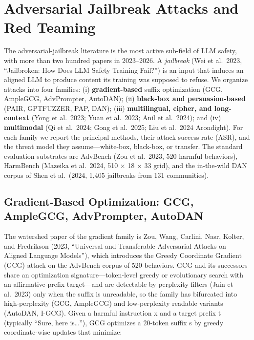 \documentclass{article}
\begin{document}
\section{Adversarial Jailbreak Attacks and Red Teaming}\label{adversarial-jailbreak-attacks-and-red-teaming}

The adversarial-jailbreak literature is the most active sub-field of LLM safety, with more than two hundred papers in 2023--2026. A \emph{jailbreak} (Wei et al.~2023, ``Jailbroken: How Does LLM Safety Training Fail?'') is an input that induces an aligned LLM to produce content its training was supposed to refuse. We organize attacks into four families: (i) \textbf{gradient-based} suffix optimization (GCG, AmpleGCG, AdvPrompter, AutoDAN); (ii) \textbf{black-box and persuasion-based} (PAIR, GPTFUZZER, PAP, DAN); (iii) \textbf{multilingual, cipher, and long-context} (Yong et al.~2023; Yuan et al.~2023; Anil et al.~2024); and (iv) \textbf{multimodal} (Qi et al.~2024; Gong et al.~2025; Liu et al.~2024 Arondight). For each family we report the principal methods, their attack-success rate (ASR), and the threat model they assume---white-box, black-box, or transfer. The standard evaluation substrates are AdvBench (Zou et al.~2023, 520 harmful behaviors), HarmBench (Mazeika et al.~2024, 510 × 18 × 33 grid), and the in-the-wild DAN corpus of Shen et al.~(2024, 1,405 jailbreaks from 131 communities).

\subsection{Gradient-Based Optimization: GCG, AmpleGCG, AdvPrompter, AutoDAN}\label{gradient-based-optimization-gcg-amplegcg-advprompter-autodan}

The watershed paper of the gradient family is Zou, Wang, Carlini, Nasr, Kolter, and Fredrikson (2023, ``Universal and Transferable Adversarial Attacks on Aligned Language Models''), which introduces the Greedy Coordinate Gradient (GCG) attack on the AdvBench corpus of 520 behaviors. GCG and its successors share an optimization signature---token-level greedy or evolutionary search with an affirmative-prefix target---and are detectable by perplexity filters (Jain et al.~2023) only when the suffix is unreadable, so the family has bifurcated into high-perplexity (GCG, AmpleGCG) and low-perplexity readable variants (AutoDAN, I-GCG). Given a harmful instruction x and a target prefix t (typically ``Sure, here is\ldots{}''), GCG optimizes a 20-token suffix s by greedy coordinate-wise updates that minimize:
\end{document}
